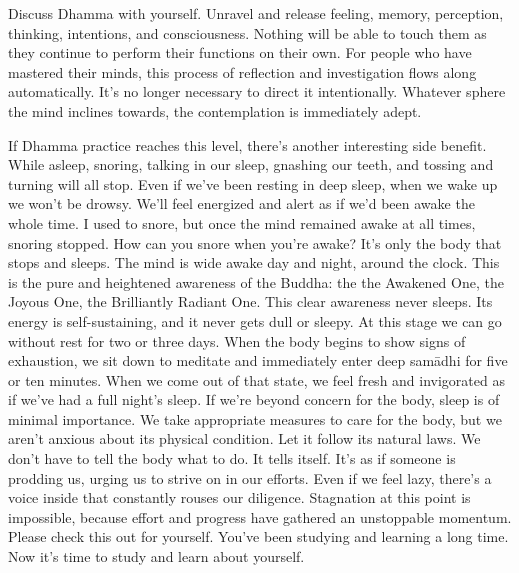 Discuss Dhamma with yourself. Unravel and release feeling, memory, perception, thinking, intentions, and consciousness. Nothing will be able to touch them as they continue to perform their functions on their own. For people who have mastered their minds, this process of reflection and investigation flows along automatically. It's no longer necessary to direct it intentionally. Whatever sphere the mind inclines towards, the contemplation is immediately adept.

If Dhamma practice reaches this level, there's another interesting side benefit. While asleep, snoring, talking in our sleep, gnashing our teeth, and tossing and turning will all stop. Even if we've been resting in deep sleep, when we wake up we won't be drowsy. We'll feel energized and alert as if we'd been awake the whole time. I used to snore, but once the mind remained awake at all times, snoring stopped. How can you snore when you're awake? It's only the body that stops and sleeps. The mind is wide awake day and night, around the clock. This is the pure and heightened awareness of the Buddha: the  the Awakened One, the Joyous One, the Brilliantly Radiant One. This clear awareness never sleeps. Its energy is self-sustaining, and it never gets dull or sleepy. At this stage we can go without rest for two or three days. When the body begins to show signs of exhaustion, we sit down to meditate and immediately enter deep sam\=adhi for five or ten minutes. When we come out of that state, we feel fresh and invigorated as if we've had a full night's sleep. If we're beyond concern for the body, sleep is of minimal importance. We take appropriate measures to care for the body, but we aren't anxious about its physical condition. Let it follow its natural laws. We don't have to tell the body what to do. It tells itself. It's as if someone is prodding us, urging us to strive on in our efforts. Even if we feel lazy, there's a voice inside that constantly rouses our diligence. Stagnation at this point is impossible, because effort and progress have gathered an unstoppable momentum. Please check this out for yourself. You've been studying and learning a long time. Now it's time to study and learn about yourself.


